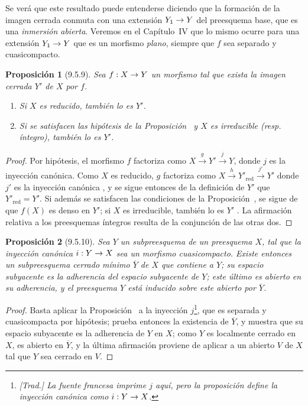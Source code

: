 \documentclass[oneside]{amsart}
\theoremstyle{ega-env-style}
\theoremstyle{ega-thm-env-style}
\newtheorem*{proposition}{Proposición}
\theoremstyle{ega-defn-env-style}
\renewcommand{\to}{\mathchoice{\longrightarrow}{\rightarrow}{\rightarrow}{\rightarrow}}
\let\EGAOriginalLabel\label
\renewcommand{\label}[1]{\phantomsection\EGAOriginalLabel{#1}}
\begin{document}
Se verá que este resultado puede entenderse diciendo que la formación de la imagen cerrada conmuta con una extensión $Y_1\to Y$ del preesquema base, que es una \emph{inmersión abierta}.
Veremos en el Capítulo~IV que lo mismo ocurre para una extensión $Y_1\to Y$ que es un morfismo \emph{plano}, siempre que $f$ sea separado y cuasicompacto.

\begin{proposition}[9.5.9]
\label{I.9.5.9}
Sea $f:X\to Y$ un morfismo tal que exista la imagen cerrada $Y'$ de $X$ por $f$.
\begin{enumerate}
  \item[{\rm(i)}] Si $X$ es reducido, también lo es $Y'$.
  \item[{\rm(ii)}] Si se satisfacen las hipótesis de la Proposición~ y $X$ es irreducible \textup{(resp.} íntegro), también lo es $Y'$.
\end{enumerate}
\end{proposition}

\begin{proof}
Por hipótesis, el morfismo $f$ factoriza como $X\xrightarrow{g}Y'\xrightarrow{j}Y$, donde $j$ es la inyección canónica.
Como $X$ es reducido, $g$ factoriza como $X\xrightarrow{h}Y'_{\mathrm{red}}\xrightarrow{j'}Y'$ donde $j'$ es la inyección canónica , y se sigue entonces de la definición de $Y'$ que $Y'_{\mathrm{red}}=Y'$.
Si además se satisfacen las condiciones de la Proposición~, se sigue de  que $f(X)$ es denso en $Y'$; si $X$ es irreducible, también lo es $Y'$ .
La afirmación relativa a los preesquemas íntegros resulta de la conjunción de las otras dos.
\end{proof}

\begin{proposition}[9.5.10]
\label{I.9.5.10}
Sea $Y$ un subpreesquema de un preesquema $X$, tal que la inyección canónica $i:Y\to X$ sea un morfismo cuasicompacto.
Existe entonces un subpreesquema cerrado mínimo $\overline{Y}$ de $X$ que contiene a $Y$; su espacio subyacente es la adherencia del espacio subyacente de $Y$; este último es abierto en su adherencia, y el preesquema $Y$ está inducido sobre este abierto por $\overline{Y}$.
\end{proposition}

\begin{proof}
Basta aplicar la Proposición~ a la inyección $j$\footnote{\emph{[Trad.] La fuente francesa imprime $j$ aquí, pero la proposición define la inyección canónica como $i:Y\to X$.}}, que es separada  y cuasicompacta por hipótesis;  prueba entonces la existencia de $\overline{Y}$, y  muestra que su espacio subyacente es la adherencia de $Y$ en $X$; como $Y$ es localmente cerrado en $X$, es abierto en $\overline{Y}$, y la última afirmación proviene de aplicar  a un abierto $V$ de $X$ tal que $Y$ sea cerrado en $V$.
\end{proof}
\end{document}
